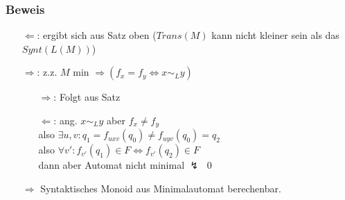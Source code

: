         \subsubsection{Beweis}
            \begin{itemize}
                \item[$\Leftarrow$:] ergibt sich aus Satz oben ($Trans(M)$ kann nicht kleiner sein als das $Synt(L(M))$)
                \item[$\Rightarrow$:] z.z. $M$ min $\Rightarrow (f_x=f_y\Leftrightarrow x\sim_L y)$
                \begin{itemize}
                    \item[$\Rightarrow$:] Folgt aus Satz
                    \item[$\Leftarrow$:] ang. $x\sim_L y$ aber $f_x\not=f_y$\\
                    also $\exists u,v: q_1=f_{uxv}(q_0)\not=f_{uyv}(q_0)=q_2$\\
                    also $\forall v': f_{v'}(q_1)\in F\Leftrightarrow f_{v'}(q_2)\in F$\\
                    dann aber Automat nicht minimal $\lightning$ \qed
                \end{itemize}
                $\Rightarrow$ Syntaktisches Monoid aus Minimalautomat berechenbar.
            \end{itemize}
